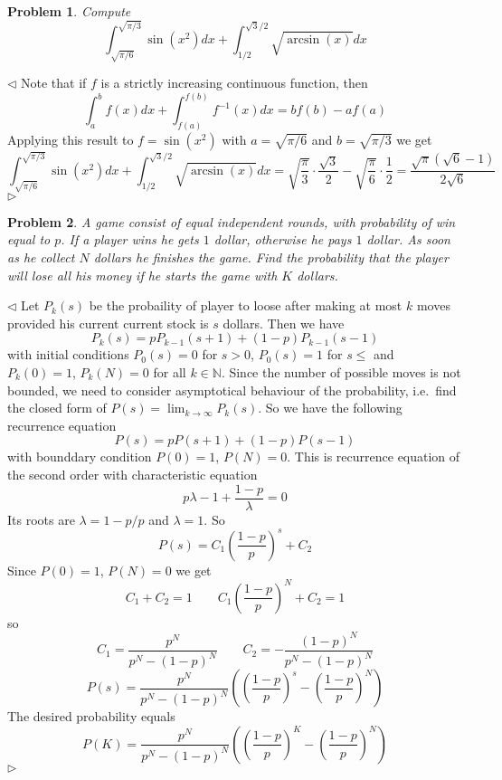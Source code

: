 \documentclass[12pt]{article}
\newtheorem{problem}{Problem}[subsection]
\newenvironment{solution}{\par $\triangleleft$}{$\triangleright$}
\begin{document}
\begin{problem} Compute
$$
    \int_{\sqrt{\pi/6}}^{\sqrt{\pi/3}}\sin(x^2)dx+
    \int_{1/2}^{\sqrt{3}/2}\sqrt{\arcsin(x)}dx
$$
\end{problem}
\begin{solution} Note that if $f$ is a strictly increasing continuous function,
    then
    $$
        \int_a^b f(x)dx+\int_{f(a)}^{f(b)} f^{-1}(x)dx=bf(b)-af(a)
    $$
    Applying this result to $f=\sin(x^2)$ with $a=\sqrt{\pi/6}$ and
    $b=\sqrt{\pi/3}$ we get
    $$
        \int_{\sqrt{\pi/6}}^{\sqrt{\pi/3}}\sin(x^2)dx+
        \int_{1/2}^{\sqrt{3}/2}\sqrt{\arcsin(x)}dx
        =\sqrt{\frac{\pi}{3}}\cdot\frac{\sqrt{3}}{2}-
        \sqrt{\frac{\pi}{6}}\cdot\frac{1}{2}
        =\frac{\sqrt{\pi}(\sqrt{6}-1)}{2\sqrt{6}}
    $$
\end{solution}

\begin{problem} A game consist of equal independent rounds, with probability of
win equal to $p$. If a player wins he gets $1$ dollar, otherwise he pays $1$
dollar. As soon as he collect $N$ dollars he finishes the game. Find the
probability that the player will lose all his money if he starts the game with
$K$ dollars.
\end{problem}
\begin{solution} Let $P_k(s)$ be the probaility of player to loose after making
    at most $k$ moves provided his current current stock is $s$ dollars. Then we
    have
    $$
        P_k(s)=pP_{k-1}(s+1)+(1-p)P_{k-1}(s-1)
    $$
    with initial conditions $P_0(s)=0$ for $s>0$, $P_0(s)=1$ for $s\leq $ and
    $P_k(0)=1$, $P_k(N)=0$ for all $k\in\mathbb{N}$. Since the number of
    possible moves is not bounded, we need to consider asymptotical behaviour of
    the probability, i.e.\ find the closed form of $P(s)=\lim_{k\to\infty}
        P_k(s)$. So we have the following recurrence equation
    $$
        P(s)=pP(s+1)+(1-p)P(s-1)
    $$
    with bounddary condition $P(0)=1$, $P(N)=0$. This is recurrence equation of
    the second order with characteristic equation
    $$
        p\lambda-1+\frac{1-p}{\lambda}=0
    $$
    Its roots are $\lambda=1-p/p$ and $\lambda=1$. So
    $$
        P(s)=C_1{\left(\frac{1-p}{p}\right)}^s+C_2
    $$
    Since $P(0)=1$, $P(N)=0$ we get
    $$
        C_1+C_2=1\qquad C_1{\left(\frac{1-p}{p}\right)}^N+C_2=1
    $$
    so
    $$
        C_1=\frac{p^N}{p^N-{(1-p)}^N}\qquad C_2=-\frac{{(1-p)}^N}{p^N-{(1-p)}^N}
    $$
    $$
        P(s)=\frac{p^N}{p^N-{(1-p)}^N}\left({\left(\frac{1-p}{p}\right)}^s-
        {\left(\frac{1-p}{p}\right)}^N\right)
    $$
    The desired  probability equals
    $$
        P(K)=\frac{p^N}{p^N-{(1-p)}^N}\left({\left(\frac{1-p}{p}\right)}^K-
        {\left(\frac{1-p}{p}\right)}^N\right)
    $$
\end{solution}
\end{document}

